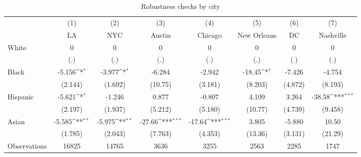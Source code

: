 {
\def\sym#1{\ifmmode^{#1}\else\(^{#1}\)\fi}
\begin{longtable}{l*{7}{c}}
\caption{Robustness checks by city}\\
\hline\hline\endfirsthead\hline\endhead\hline\endfoot\endlastfoot
                    &\multicolumn{1}{c}{(1)}&\multicolumn{1}{c}{(2)}&\multicolumn{1}{c}{(3)}&\multicolumn{1}{c}{(4)}&\multicolumn{1}{c}{(5)}&\multicolumn{1}{c}{(6)}&\multicolumn{1}{c}{(7)}\\
                    &\multicolumn{1}{c}{LA}&\multicolumn{1}{c}{NYC}&\multicolumn{1}{c}{Austin}&\multicolumn{1}{c}{Chicago}&\multicolumn{1}{c}{New Orleans}&\multicolumn{1}{c}{DC}&\multicolumn{1}{c}{Nashville}\\
\hline
White               &           0         &           0         &           0         &           0         &           0         &           0         &           0         \\
                    &         (.)         &         (.)         &         (.)         &         (.)         &         (.)         &         (.)         &         (.)         \\
[1em]
Black               &      -5.156\sym{*}  &      -3.977\sym{*}  &      -6.284         &      -2.942         &      -18.45\sym{*}  &      -7.426         &      -4.754         \\
                    &     (2.144)         &     (1.692)         &     (10.75)         &     (3.181)         &     (8.203)         &     (4.872)         &     (8.193)         \\
[1em]
Hispanic            &      -5.621\sym{*}  &      -1.246         &       0.877         &      -0.807         &       4.109         &       3.264         &      -38.58\sym{***}\\
                    &     (2.197)         &     (1.937)         &     (5.212)         &     (5.180)         &     (10.77)         &     (4.739)         &     (9.458)         \\
[1em]
Asian               &      -5.585\sym{**} &      -5.975\sym{**} &      -27.66\sym{***}&      -17.64\sym{***}&       3.805         &      -5.880         &       10.50         \\
                    &     (1.785)         &     (2.043)         &     (7.763)         &     (4.353)         &     (13.36)         &     (3.131)         &     (21.29)         \\
\hline
Observations        &       16825         &       14765         &        3636         &        3255         &        2563         &        2285         &        1747         \\

\end{longtable}}
